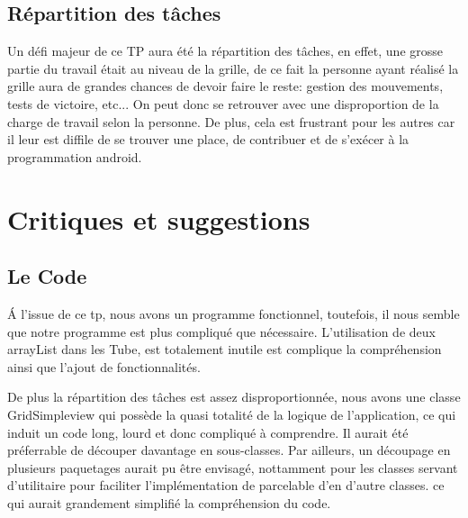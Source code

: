 \documentclass[12pt, a4paper]{article}%
\begin{document}
 
  \subsection{Répartition des tâches}
  Un défi majeur de ce TP aura été la répartition des tâches, en effet, une grosse partie du travail était au niveau de la grille,
  de ce fait la personne ayant réalisé la grille aura de grandes chances de devoir faire le reste: gestion des mouvements, tests
  de victoire, etc...
  On peut donc se retrouver avec une disproportion de la charge de travail selon la personne. De plus, cela est frustrant pour les
  autres car il leur est diffile de se trouver une place, de contribuer et de s'exécer à la programmation android.
\section{Critiques et suggestions}
  \subsection{Le Code}
  \'A l'issue de ce tp, nous avons un programme fonctionnel, toutefois, il nous semble que notre programme est plus compliqué que
  nécessaire. L'utilisation de deux arrayList dans les Tube, est totalement inutile est complique la compréhension ainsi que
  l'ajout de fonctionnalités.
  \newline

  De plus la répartition des tâches est assez disproportionnée, nous avons une classe GridSimpleview qui possède la quasi totalité
  de la logique de l'application, ce qui induit un code long, lourd et donc compliqué à comprendre. Il aurait été préferrable de
  découper davantage en sous-classes. Par ailleurs, un découpage en plusieurs paquetages aurait pu être envisagé, nottamment pour
  les classes servant d'utilitaire pour faciliter l'implémentation de parcelable d'en d'autre classes. ce qui aurait grandement
  simplifié la compréhension du code.
\end{document}

